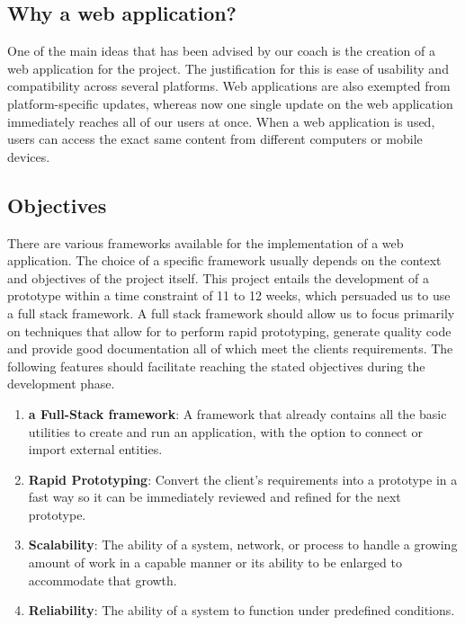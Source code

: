 \subsection{Why a web application?}
One of the main ideas that has been advised by our coach is the creation of a web application for the project. The justification for this is ease of usability and compatibility across several platforms. Web applications are also exempted from platform-specific updates, whereas now one single update on the web application immediately reaches all of our users at once. When a web application is used, users can access the exact same content from different computers or mobile devices.
\subsection{Objectives}
There are various frameworks available for the implementation of a web application. The choice of a specific framework usually depends on the context and objectives of the project itself. This project entails the development of a prototype within a time constraint of 11 to 12 weeks, which persuaded us to use a full stack framework. A full stack framework should allow us to focus primarily on techniques that allow for to perform rapid prototyping, generate quality code and provide good documentation all of which meet the clients requirements. The following features should facilitate reaching the stated objectives during the development phase.

\begin{enumerate}
	\item \textbf{a Full-Stack framework}: A framework that already contains all the basic utilities to create and run an application, with the option to connect or import external entities.
	\item \textbf{Rapid Prototyping}: Convert the client's requirements into a prototype in a fast way so it can be immediately reviewed and refined for the next prototype.
	\item \textbf{Scalability}: The ability of a system, network, or process to handle a growing amount of work in a capable manner or its ability to be enlarged to accommodate that growth.\cite{wiki:scalability}
	\item \textbf{Reliability}: The ability of a system to function under predefined conditions.
\end{enumerate}

